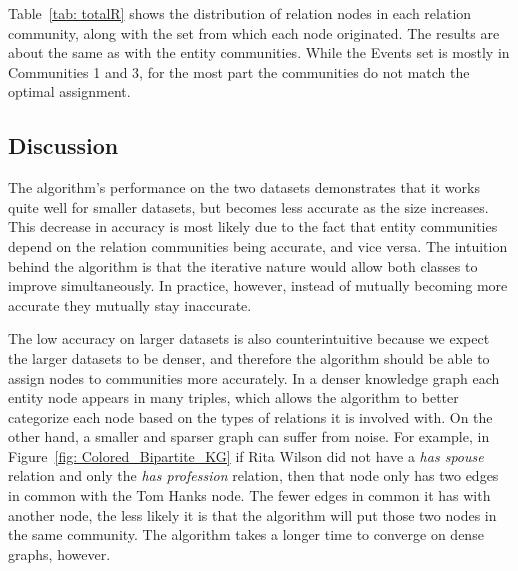 \documentclass[12pt]{article}
\begin{document}
\newpage

Table~\ref{tab: totalR} shows the distribution of relation nodes in each
relation community, along with the set from which each node originated. The
results are about the same as with the entity communities. While the Events set
is mostly in Communities 1 and 3, for the most part the communities do not
match the optimal assignment.


\subsection{Discussion}
\label{Discussion}

The algorithm's performance on the two datasets demonstrates that it works quite
well for smaller datasets, but becomes less accurate as the size increases. This
decrease in accuracy is most likely due to the fact that entity communities depend
on the relation communities being accurate, and vice versa. The intuition behind
the algorithm is that the iterative nature would allow both classes to improve
simultaneously. In practice, however, instead of mutually becoming more accurate
they mutually stay inaccurate.

The low accuracy on larger datasets is also counterintuitive because we expect
the larger datasets to be denser, and therefore the algorithm should be able to
assign nodes to communities more accurately. In a denser knowledge graph each
entity node appears in many triples, which allows the algorithm to better
categorize each node based on the types of relations it is involved with. On the
other hand, a smaller and sparser graph can suffer from noise. For example, in
Figure~\ref{fig: Colored_Bipartite_KG} if Rita Wilson did not have a \textit{has
spouse} relation and only the \textit{has profession} relation, then that node
only has two edges in common with the Tom Hanks node. The fewer edges in common
it has with another node, the less likely it is that the algorithm will put
those two nodes in the same community. The algorithm takes a longer time to
converge on dense graphs, however.
\end{document}
